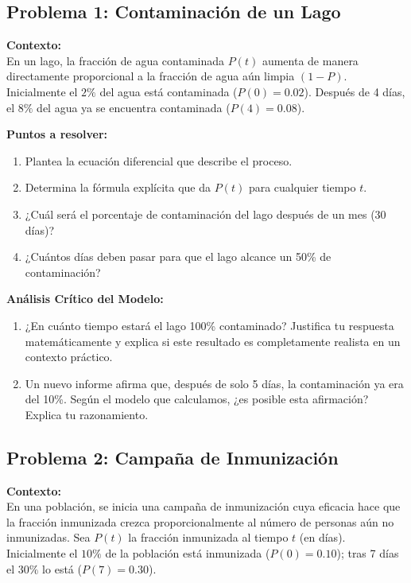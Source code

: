 \documentclass[12pt,a4paper]{article}
\begin{document}
\subsection*{Problema 1: Contaminación de un Lago}
\textbf{Contexto:}
\\
En un lago, la fracción de agua contaminada $P(t)$ aumenta de manera directamente proporcional a la fracción de agua aún limpia $(1-P)$. Inicialmente el $2\%$ del agua está contaminada ($P(0) = 0.02$). Después de 4 días, el $8\%$ del agua ya se encuentra contaminada ($P(4) = 0.08$).

\textbf{Puntos a resolver:}
\begin{enumerate}[label=\textbf{\Alph*.},leftmargin=2em]
    \item Plantea la ecuación diferencial que describe el proceso.
    \item Determina la fórmula explícita que da $P(t)$ para cualquier tiempo $t$.
    \item ¿Cuál será el porcentaje de contaminación del lago después de un mes (30 días)?
    \item ¿Cuántos días deben pasar para que el lago alcance un 50\% de contaminación?
\end{enumerate}

\textbf{Análisis Crítico del Modelo:}
\begin{enumerate}[label=\textbf{E\arabic*.},leftmargin=2em]
    \item ¿En cuánto tiempo estará el lago 100\% contaminado? Justifica tu respuesta matemáticamente y explica si este resultado es completamente realista en un contexto práctico.
    \item Un nuevo informe afirma que, después de solo 5 días, la contaminación ya era del 10\%. Según el modelo que calculamos, ¿es posible esta afirmación? Explica tu razonamiento.
\end{enumerate}

\subsection*{Problema 2: Campaña de Inmunización}
\textbf{Contexto:}
\\
En una población, se inicia una campaña de inmunización cuya eficacia hace que la fracción inmunizada crezca proporcionalmente al número de personas aún no inmunizadas. Sea $P(t)$ la fracción inmunizada al tiempo $t$ (en días). Inicialmente el $10\%$ de la población está inmunizada ($P(0) = 0.10$); tras 7 días el $30\%$ lo está ($P(7) = 0.30$).
\end{document}

